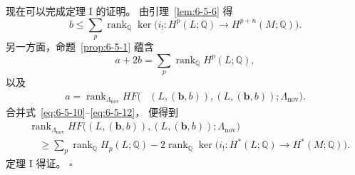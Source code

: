 现在可以完成定理 I 的证明。
由引理~\ref{lem:6-5-6} 得
\begin{equation}
b\le
\sum_p\operatorname{rank}_{\mathbb Q}
\ker\bigl(i_!:H^p(L;\mathbb Q)
\to H^{p+n}(M;\mathbb Q)\bigr).
\tag{6.5.10}\label{eq:6-5-10}
\end{equation}
另一方面，命题~\ref{prop:6-5-1} 蕴含
\begin{equation}
a+2b=\sum_p\operatorname{rank}_{\mathbb Q}
H^p(L;\mathbb Q),
\tag{6.5.11}\label{eq:6-5-11}
\end{equation}
以及
\begin{equation}
\begin{aligned}
a=\operatorname{rank}_{\Lambda_{\mathrm{nov}}}
HF\bigl(& (L,(\boldsymbol b,b)),
(L,(\boldsymbol b,b));
\Lambda_{\mathrm{nov}}\bigr).
\end{aligned}
\tag{6.5.12}\label{eq:6-5-12}
\end{equation}
合并式~\eqref{eq:6-5-10}--\eqref{eq:6-5-12}，
便得到
\[
\begin{aligned}
&\operatorname{rank}_{\Lambda_{\mathrm{nov}}}
HF\bigl((L,(\boldsymbol b,b)),
(L,(\boldsymbol b,b));\Lambda_{\mathrm{nov}}\bigr)\\
&\quad\ge
\sum_p\operatorname{rank}_{\mathbb Q}H_p(L;\mathbb Q)
-2\operatorname{rank}_{\mathbb Q}
\ker\bigl(i_!:H^*(L;\mathbb Q)
\to H^*(M;\mathbb Q)\bigr).
\end{aligned}
\]
定理 I 得证。
\hfill$\square$
